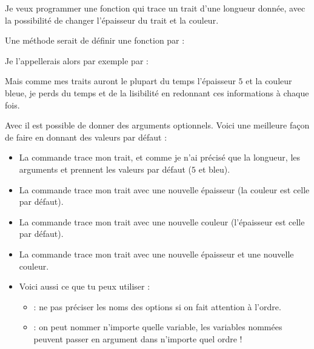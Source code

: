 \documentclass[11pt,class=report,crop=false]{standalone}
\begin{document}
\begin{cours}


Je veux programmer une fonction qui trace un trait d'une longueur donnée, avec la possibilité de changer l'épaisseur du trait et la couleur.

Une méthode serait de définir une fonction par : \\
 \centerline{}
 Je l'appellerais alors par exemple par :\\
 \centerline{} 
Mais comme mes traits auront le plupart du temps l'épaisseur $5$ et la couleur bleue, je perds du temps et de la lisibilité en redonnant ces informations à chaque fois.

\medskip

Avec \Python{} il est possible de donner des arguments optionnels. Voici une meilleure façon de faire en donnant des valeurs par défaut :\\
 \centerline{}
 
\begin{itemize}
  \item La commande  trace mon trait, et comme je n'ai précisé que la longueur, les arguments  et  prennent les valeurs par défaut ($5$ et bleu).
  
   \item La commande  trace mon trait avec une nouvelle épaisseur (la couleur est celle par défaut).
   
    \item La commande  trace mon trait avec une nouvelle couleur (l'épaisseur est celle par défaut).  
    
     \item La commande  trace mon trait avec une nouvelle épaisseur et une nouvelle couleur.
     
     \item Voici aussi ce que tu peux utiliser :
     \begin{itemize}
       \item {} : ne pas préciser les noms des options si on fait attention à l'ordre.
       \item {} : on peut nommer n'importe quelle variable, les variables nommées peuvent passer en argument dans n'importe quel ordre !
 
  \end{itemize}   
\end{itemize}   
\end{cours}
\end{document}
